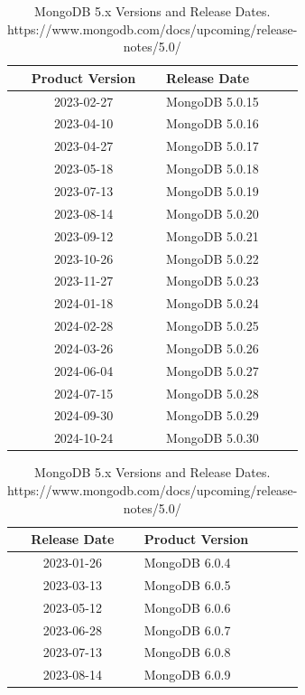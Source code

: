 \documentclass[../main.tex]{subfiles}
\begin{document}
\begin{table}[h]
\centering
\begin{minipage}{0.45\textwidth}
\centering
\begin{tabular}{|c|l|}
\hline
\textbf{Product Version} & \textbf{Release Date} \\ \hline
    2023-02-27 & MongoDB 5.0.15 \\ \hline
    2023-04-10 & MongoDB 5.0.16 \\ \hline
    2023-04-27 & MongoDB 5.0.17 \\ \hline
    2023-05-18 & MongoDB 5.0.18 \\ \hline
    2023-07-13 & MongoDB 5.0.19 \\ \hline
    2023-08-14 & MongoDB 5.0.20 \\ \hline
    2023-09-12 & MongoDB 5.0.21 \\ \hline
    2023-10-26 & MongoDB 5.0.22 \\ \hline
    2023-11-27 & MongoDB 5.0.23 \\ \hline
    2024-01-18 & MongoDB 5.0.24 \\ \hline
    2024-02-28 & MongoDB 5.0.25 \\ \hline
    2024-03-26 & MongoDB 5.0.26 \\ \hline
    2024-06-04 & MongoDB 5.0.27 \\ \hline
    2024-07-15 & MongoDB 5.0.28 \\ \hline
    2024-09-30 & MongoDB 5.0.29 \\ \hline
    2024-10-24 & MongoDB 5.0.30 \\ \hline
\end{tabular}
\caption{MongoDB 5.x Versions and Release Dates. https://www.mongodb.com/docs/upcoming/release-notes/5.0/}
\end{minipage}
\hspace{1cm} %
\begin{minipage}{0.45\textwidth}
\centering
\begin{tabular}{|c|l|}
\hline
\textbf{Release Date} & \textbf{Product Version} \\ \hline
    2023-01-26 & MongoDB 6.0.4 \\ \hline
    2023-03-13 & MongoDB 6.0.5 \\ \hline
    2023-05-12 & MongoDB 6.0.6 \\ \hline
    2023-06-28 & MongoDB 6.0.7 \\ \hline
    2023-07-13 & MongoDB 6.0.8 \\ \hline
    2023-08-14 & MongoDB 6.0.9 \\ \hline

\end{tabular}
\end{minipage}
\end{table}
\end{document}
